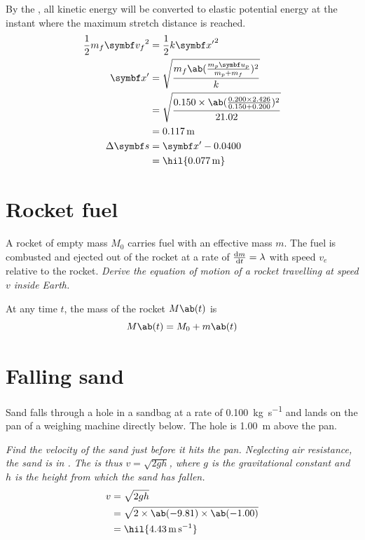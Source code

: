 By the , all kinetic energy will be
converted to elastic potential energy at the instant where the
maximum stretch distance is reached.
\begin{align*}
  \frac{1}{2}m_f{\mv{v}_f}^2 &= \frac{1}{2}k{\mv{x}'}^2 \\
  \mv{x}' &= \sqrt{\f{m_f\ab(\f{m_p\mv{u}_p}{m_p + m_f})^2}{k}} \\
  &= \sqrt{\f{0.150\times \ab(\f{0.200\times 2.426}{0.150 +
  0.200})^2}{21.02}} \\
  &= \qty{0.117}{\metre} \\
  \Delta\mv{s} &= \mv{x}' - 0.0400 \\
  &= \hil{\qty{0.077}{\metre}}
\end{align*}

\section{Rocket fuel}
A rocket of empty mass \(M_0\) carries fuel with an effective mass \(m\).
The fuel is combusted and ejected out of the rocket at a rate of
\(\odv{m}{t} = \lambda\)
with speed \(v_e\) relative to the rocket. \it{Derive the equation of
motion of a rocket travelling at speed \(v\) inside Earth.}

At any time \(t\), the mass of the rocket \(M\ab(t)\) is
\begin{equation}
  M\ab(t) = M_0 + m\ab(t)
  \label{eq:mt}
\end{equation}

\section{Falling sand}
Sand falls through a hole in a sandbag at a rate of
\qty{0.100}{\kg\per\second} and lands
on the pan of a weighing machine directly below. The hole is
\qty{1.00}{\metre} above the pan.

\it{Find the velocity of the sand just before it hits the pan.}
Neglecting air resistance, the sand is in . The
 is thus
\(v = \sqrt{2gh}\), where \(g\) is the gravitational constant and
\(h\) is the height from which
the sand has fallen.
\begin{align*}
  v &= \sqrt{2 g h} \\
  &= \sqrt{2 \times \ab(-9.81) \times \ab(-1.00)} \\
  &= \hil{\qty{4.43}{\metre\per\second}}
\end{align*}

